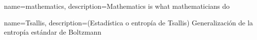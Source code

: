 
{
    name=mathematics,
    description={Mathematics is what mathematicians do}
}

{
    name=Tsallis,
    description={(Estadística o entropía de Tsallis) Generalización de la entropía estándar de Boltzmann}
}
